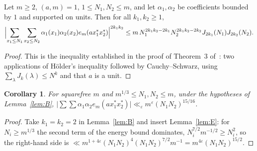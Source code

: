 \documentclass[11pt,a4paper]{article}
\newtheorem{corollary}[theorem]{Corollary}\theoremstyle{remark}\newtheorem{remark}[theorem]{Remark}
\begin{document}
\begin{lemma}\label{lem:B}
Let $m\ge2$, $(a,m)=1$, $1\le N_1,N_2\le m$, and let $\alpha_1,\alpha_2$ be coefficients bounded by $1$ and supported on units. Then for all $k_1,k_2\ge1$,
\[
\Bigl|\sum_{x_1\le N_1}\sum_{x_2\le N_2}\alpha_1(x_1)\alpha_2(x_2)e_m(ax_1^\ast x_2^\ast)\Bigr|^{2k_1k_2}\le m\,N_1^{2k_1k_2-2k_1}N_2^{2k_1k_2-2k_2}J_{2k_1}(N_1)J_{2k_2}(N_2).
\]
\end{lemma}
\begin{proof}
This is the inequality established in the proof of Theorem~3 of~\cite{BourgainGaraev2014}: two applications of H\"older's inequality followed by Cauchy--Schwarz, using
$\sum_\lambda J_{k}(\lambda)\le N^{k}$ and that $a$ is a unit.
\end{proof}

\begin{corollary}\label{cor:B}
For squarefree $m$ and $m^{1/3}\le N_1,N_2\le m$, under the hypotheses of Lemma~\ref{lem:B},
$\bigl|\sum\sum\alpha_1\alpha_2e_m(ax_1^\ast x_2^\ast)\bigr|\ll_\varepsilon m^{\varepsilon}(N_1N_2)^{15/16}$.
\end{corollary}
\begin{proof}
Take $k_1=k_2=2$ in Lemma~\ref{lem:B} and insert Lemma~\ref{lem:E}: for $N_i\ge m^{1/3}$ the second term of the energy bound dominates, $N_i^{7/2}m^{-1/2}\ge N_i^2$, so the
right-hand side is $\ll m^{1+4\varepsilon}(N_1N_2)^4(N_1N_2)^{7/2}m^{-1}=m^{4\varepsilon}(N_1N_2)^{15/2}$.
\end{proof}
\end{document}
